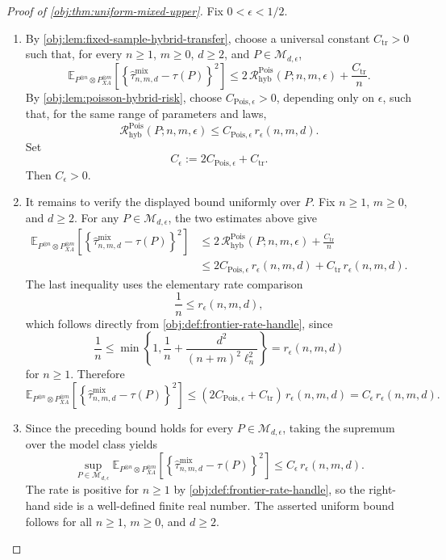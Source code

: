\begin{proof}[Proof of \cref{obj:thm:uniform-mixed-upper}]
Fix \(0<\epsilon<1/2\).

\begin{enumerate}
\item By \cref{obj:lem:fixed-sample-hybrid-transfer}, choose a universal constant \(C_{\mathrm{tr}}>0\) such that, for every \(n\ge1\), \(m\ge0\), \(d\ge2\), and \(P\in\mathcal M_{d,\epsilon}\),
\[
\mathbb E_{P^{\otimes n}\otimes P_{XA}^{\otimes m}}
\!\left[
\left\{\widehat\tau^{\mathrm{mix}}_{n,m,d}-\tau(P)\right\}^2
\right]
\le
2\,\mathcal R^{\mathrm{Pois}}_{\mathrm{hyb}}(P;n,m,\epsilon)
+\frac{C_{\mathrm{tr}}}{n}.
\]
By \cref{obj:lem:poisson-hybrid-risk}, choose \(C_{\mathrm{Pois},\epsilon}>0\), depending only on \(\epsilon\), such that, for the same range of parameters and laws,
\[
\mathcal R^{\mathrm{Pois}}_{\mathrm{hyb}}(P;n,m,\epsilon)
\le
C_{\mathrm{Pois},\epsilon}\,r_\epsilon(n,m,d).
\]
Set
\[
C_\epsilon:=2C_{\mathrm{Pois},\epsilon}+C_{\mathrm{tr}}.
\]
Then \(C_\epsilon>0\). %

\item It remains to verify the displayed bound uniformly over \(P\). Fix \(n\ge1\), \(m\ge0\), and \(d\ge2\). For any \(P\in\mathcal M_{d,\epsilon}\), the two estimates above give
\[
\begin{aligned}
\mathbb E_{P^{\otimes n}\otimes P_{XA}^{\otimes m}}
\!\left[
\left\{\widehat\tau^{\mathrm{mix}}_{n,m,d}-\tau(P)\right\}^2
\right]
&\le
2\,\mathcal R^{\mathrm{Pois}}_{\mathrm{hyb}}(P;n,m,\epsilon)
+\frac{C_{\mathrm{tr}}}{n}  \\
&\le
2C_{\mathrm{Pois},\epsilon}\,r_\epsilon(n,m,d)
+C_{\mathrm{tr}}\,r_\epsilon(n,m,d).
\end{aligned}
\]
The last inequality uses the elementary rate comparison
\[
\frac1n\le r_\epsilon(n,m,d),
\]
which follows directly from \cref{obj:def:frontier-rate-handle}, since
\[
\frac1n
\le
\min\!\left\{
1,\frac1n+\frac{d^2}{(n+m)^2\ell_n^2}
\right\}
=
r_\epsilon(n,m,d)
\]
for \(n\ge1\). Therefore
\[
\mathbb E_{P^{\otimes n}\otimes P_{XA}^{\otimes m}}
\!\left[
\left\{\widehat\tau^{\mathrm{mix}}_{n,m,d}-\tau(P)\right\}^2
\right]
\le
(2C_{\mathrm{Pois},\epsilon}+C_{\mathrm{tr}})\,r_\epsilon(n,m,d)
=
C_\epsilon\,r_\epsilon(n,m,d).
\] %

\item Since the preceding bound holds for every \(P\in\mathcal M_{d,\epsilon}\), taking the supremum over the model class yields
\[
\sup_{P\in\mathcal M_{d,\epsilon}}
\mathbb E_{P^{\otimes n}\otimes P_{XA}^{\otimes m}}
\!\left[
\left\{\widehat\tau^{\mathrm{mix}}_{n,m,d}-\tau(P)\right\}^2
\right]
\le
C_\epsilon\,r_\epsilon(n,m,d).
\]
The rate is positive for \(n\ge1\) by \cref{obj:def:frontier-rate-handle}, so the right-hand side is a well-defined finite real number. The asserted uniform bound follows for all \(n\ge1\), \(m\ge0\), and \(d\ge2\). %
\end{enumerate}
\end{proof}

